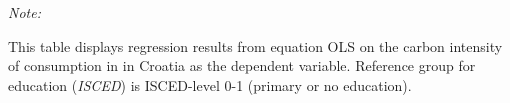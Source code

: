 \begin{table}[htbp!]
\begin{adjustbox}{width = 1\textwidth, max height = 0.95\textheight, center}
\begin{threeparttable}[b]
         \begin{tablenotes}\item \medskip \textit{Note:}
            \item This table displays regression results from equation OLS on the carbon intensity of consumption in  in Croatia as the dependent variable. Reference group for education (\textit{ISCED}) is ISCED-level 0-1 (primary or no education).
         \end{tablenotes}
      \end{threeparttable}
   \end{adjustbox}
\end{table}


